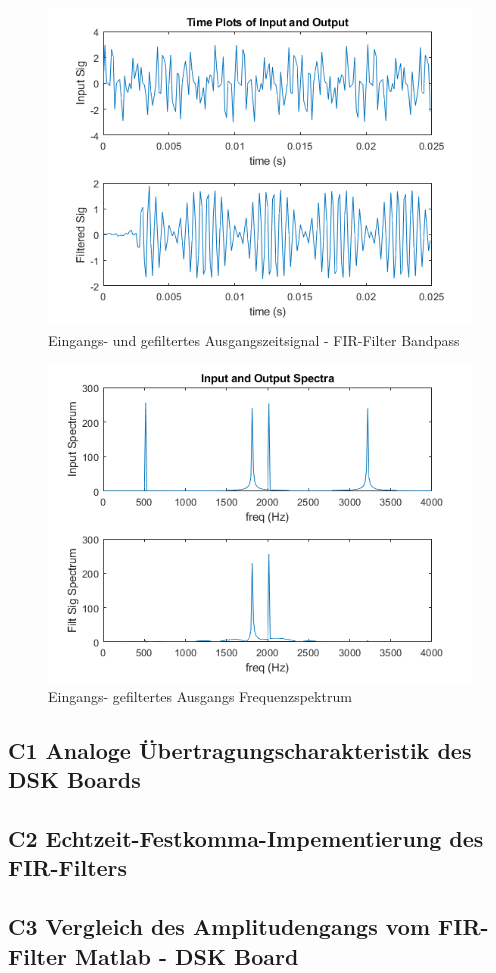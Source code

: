 \begin{figure}[h]
\centering
\includegraphics[width=0.7\linewidth]{./Bilder/Attachment_B_fir_3_Timeplot}
\caption{Eingangs- und gefiltertes Ausgangszeitsignal  - FIR-Filter Bandpass}
\label{fig:Attachment_B_fir_3_Timeplot}
\end{figure}


\begin{figure}[h]
\centering
\includegraphics[width=0.7\linewidth]{./Bilder/Attachment_B_fir_3_Spektrum}
\caption{Eingangs- gefiltertes Ausgangs Frequenzspektrum}
\label{fig:Attachment_B_fir_3_Spektrum}
\end{figure}


\newpage
\subsection{C1 Analoge Übertragungscharakteristik des DSK Boards}

\subsection{C2 Echtzeit-Festkomma-Impementierung des FIR-Filters}


\subsection{C3 Vergleich des Amplitudengangs vom FIR-Filter Matlab - DSK Board}

